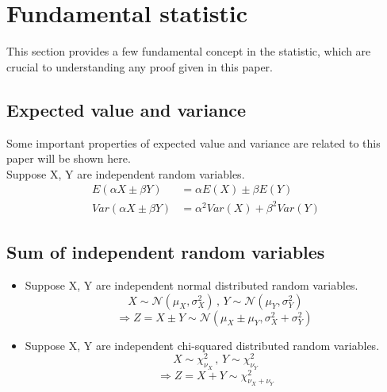 \section{Fundamental statistic} \label{appendixa}
This section provides a few fundamental concept in the statistic, which are crucial to understanding any proof given in this paper.
\subsection{Expected value and variance}
Some important properties of expected value and variance are related to this paper will be shown here.\\
Suppose X, Y are independent random variables.
\begin{align}
E(\alpha X \pm \beta Y) & = \alpha E(X) \pm \beta E(Y) \label{eq:e} \\
Var(\alpha X \pm \beta Y) & = \alpha^2 Var(X) + \beta^2 Var(Y) \label{eq:var}
\end{align}
\subsection{Sum of independent random variables}
\begin{itemize}
	\item Suppose X, Y are independent normal distributed random variables.
	\begin{displaymath}
		X \sim \mathcal {N}(\mu_X,\sigma_X^2)\,,\, Y \sim \mathcal {N}(\mu_Y,\sigma_Y^2)
	\end{displaymath}
	\begin{equation} \label{eq:sum-norm}
		\Rightarrow Z = X \pm Y  \sim \mathcal {N}(\mu_X\pm\mu_Y,\sigma_X^2+\sigma_Y^2)\ 
	\end{equation}
	\item Suppose X, Y are independent chi-squared distributed random variables.
	\begin{displaymath}
		X \sim \chi_{\nu_X}^2\,,\, Y \sim \chi_{\nu_Y}^2
	\end{displaymath}
	\begin{equation} \label{eq:sum-chi}
		\Rightarrow Z = X + Y  \sim \chi_{\nu_X+\nu_Y}^2 
	\end{equation}
\end{itemize}
